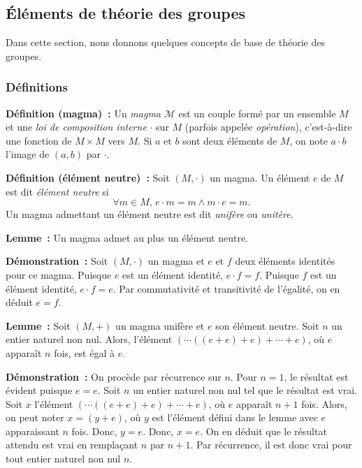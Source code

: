 \subsection{Éléments de théorie des groupes}

Dans cette section, nous donnons quelques concepts de base de théorie des groupes. 

\subsubsection{Définitions}

\noindent\textbf{Définition (magma) :} Un \textit{magma} $\mathcal{M}$ est un couple formé par un ensemble $M$ et une \textit{loi de composition interne} $\cdot$ sur $M$ (parfois appelée \textit{opération}), c'est-à-dire une fonction de $M \times M$ vers $M$. 
    Si $a$ et $b$ sont deux éléments de $M$, on note $a \cdot b$ l'image de $(a,b)$ par $\cdot$.

\medskip

\noindent\textbf{Définition (élément neutre) :} Soit $(M,\cdot)$ un magma.
    Un élément $e$ de $M$ est dit \textit{élément neutre} si 
    \begin{equation*}
        \forall m \in M, \, e \cdot m = m \wedge m \cdot e = m.
    \end{equation*}
    Un magma admettant un élément neutre est dit \textit{unifère} ou \textit{unitère}.

\medskip

\noindent\textbf{Lemme :} Un magma admet au plus un élément neutre.

\medskip

\noindent\textbf{Démonstration :} Soit $(M,\cdot)$ un magma et $e$ et $f$ deux éléments identités pour ce magma.
    Puisque $e$ est un élément identité, $e \cdot f = f$.
    Puisque $f$ est un élément identité, $e \cdot f = e$.
    Par commutativité et transitivité de l'égalité, on en déduit $e = f$.

    \hfill \square

\medskip

\noindent\textbf{Lemme :} Soit $(M, +)$ un magma unifère et $e$ son élément neutre.
    Soit $n$ un entier naturel non nul.
    Alors, l'élément $(\cdots ((e + e) + e) + \cdots +e)$, où $e$ apparaît $n$ fois, est égal à $e$.

\medskip

\noindent\textbf{Démonstration :} On procède par récurrence sur $n$. 
    Pour $n = 1$, le résultat est évident puisque $e = e$.
    Soit $n$ un entier naturel non nul tel que le résultat est vrai. 
    Soit $x$ l'élément $(\cdots ((e+e) + e) + \cdots + e)$, où $e$ apparaît $n+1$ fois. 
    Alors, on peut noter $x = (y + e)$, où $y$ est l'élément défini dans le lemme avec $e$ apparaissant $n$ fois. 
    Donc, $y = e$.
    Donc, $x = e$. 
    On en déduit que le résultat attendu est vrai en remplaçant $n$ par $n+1$. 
    Par récurrence, il est donc vrai pour tout entier naturel non nul $n$.

